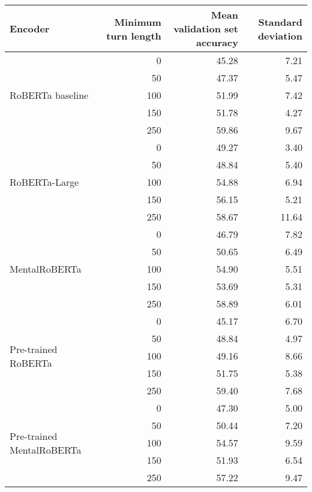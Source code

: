 \begin{tabular}{lrrr}
\toprule
Encoder & Minimum turn length & Mean validation set accuracy & Standard deviation \\
\midrule
\multirow{5}{*}{RoBERTa baseline} & 0 & 45.28 & 7.21 \\
& 50 & 47.37 & 5.47 \\
& 100 & 51.99 & 7.42 \\
& 150 & 51.78 & 4.27 \\
& 250 & 59.86 & 9.67 \\
\midrule
\multirow{5}{*}{RoBERTa-Large} & 0 & 49.27 & 3.40 \\
& 50 & 48.84 & 5.40 \\
& 100 & 54.88 & 6.94 \\
& 150 & 56.15 & 5.21 \\
& 250 & 58.67 & 11.64 \\
\midrule
\multirow{5}{*}{MentalRoBERTa} & 0 & 46.79 & 7.82 \\
& 50 & 50.65 & 6.49 \\
& 100 & 54.90 & 5.51 \\
& 150 & 53.69 & 5.31 \\
& 250 & 58.89 & 6.01 \\
\midrule
\multirow{5}{*}{Pre-trained RoBERTa} & 0 & 45.17 & 6.70 \\
& 50 & 48.84 & 4.97 \\
& 100 & 49.16 & 8.66 \\
& 150 & 51.75 & 5.38 \\
& 250 & 59.40 & 7.68 \\
\midrule
\multirow{5}{*}{Pre-trained MentalRoBERTa} & 0 & 47.30 & 5.00 \\
& 50 & 50.44 & 7.20 \\
& 100 & 54.57 & 9.59 \\
& 150 & 51.93 & 6.54 \\
& 250 & 57.22 & 9.47 \\
\bottomrule
\end{tabular}
